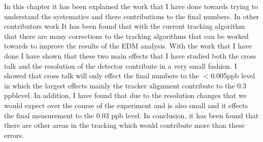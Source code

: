 \documentclass[./Thesis]{subfiles}
\begin{document}
	In this chapter it has been explained the work that I have done towards trying to understand the systematics and there contributions to the final numbers. In other contributors work It has been found that with the current tracking algorithm that there are many corrections to the tracking algorithms that can be worked towards to improve the results of the EDM analysis. With the work that I have done I have shown that these two main effects that I have studied both the cross talk and the resolution of the detector contribute in a very small fashion. I showed that cross talk will only effect the final numbers to the $<$0.005ppb level in which the largest effects mainly the tracker alignment contribute to the 0.3 ppblevel. In addition, I have found that due to the resolution changes that we would expect over the course of the experiment and is also small and it effects the final measurement to the 0.03 ppb level. In conclusion, it has been found that there are other areas in the tracking which would contribute more than these errors.
\end{document}
